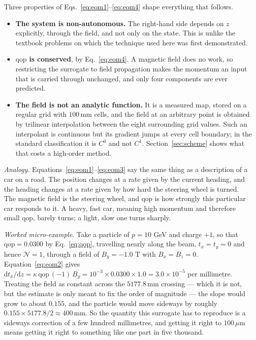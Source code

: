 \documentclass[11pt,a4paper]{article}
\newcommand{\um}{\ensuremath{\,\mu\mathrm{m}}}
\newcommand{\mm}{\ensuremath{\,\mathrm{mm}}}
\newcommand{\qop}{\ensuremath{\mathrm{qop}}}
\begin{document}
Three properties of Eqs.~\eqref{eq:eom1}--\eqref{eq:eom4} shape everything that
follows.

\begin{itemize}
  \item \textbf{The system is non-autonomous.} The right-hand side depends on
  $z$ explicitly, through the field, and not only on the state. This is unlike
  the textbook problems on which the technique used here was first
  demonstrated.
  \item \textbf{$\qop$ is conserved}, by Eq.~\eqref{eq:eom4}. A magnetic field
  does no work, so restricting the surrogate to field propagation makes the
  momentum an input that is carried through unchanged, and only four components
  are ever predicted.
  \item \textbf{The field is not an analytic function.} It is a measured map,
  stored on a regular grid with $100\mm$ cells, and the field at an arbitrary
  point is obtained by trilinear interpolation between the eight surrounding
  grid values. Such an interpolant is continuous but its gradient jumps at
  every cell boundary; in the standard classification it is $C^0$ and not
  $C^1$. Section~\ref{sec:scheme} shows what that costs a high-order method.
\end{itemize}

\emph{Analogy.} Equations~\eqref{eq:eom1}--\eqref{eq:eom3} say the same thing
as a description of a car on a road. The position changes at a rate given by
the current heading, and the heading changes at a rate given by how hard the
steering wheel is turned. The magnetic field is the steering wheel, and $\qop$
is how strongly this particular car responds to it. A heavy, fast car, meaning
high momentum and therefore small $\qop$, barely turns; a light, slow one turns
sharply.

\emph{Worked micro-example.} Take a particle of $p = 10$ GeV and charge $+1$,
so that $\qop = 0.0300$ by Eq.~\eqref{eq:qop}, travelling nearly along the
beam, $t_x = t_y = 0$ and hence $\mathcal{N} = 1$, through a field of
$B_y = -1.0$ T with $B_x = B_z = 0$. Equation~\eqref{eq:eom2} gives
$\mathrm{d}t_x/\mathrm{d}z = \kappa\,\qop\,(-1)\,B_y
 = 10^{-3} \times 0.0300 \times 1.0 = 3.0\times10^{-5}$ per millimetre.
Treating the field as constant across the $5177.8\mm$ crossing --- which it is
not, but the estimate is only meant to fix the order of magnitude --- the slope
would grow to about $0.155$, and the particle would move sideways by roughly
$0.155 \times 5177.8/2 \approx 400\mm$. So the quantity this surrogate has to
reproduce is a sideways correction of a few hundred millimetres, and getting it
right to $100\um$ means getting it right to something like one part in five
thousand.
\end{document}
